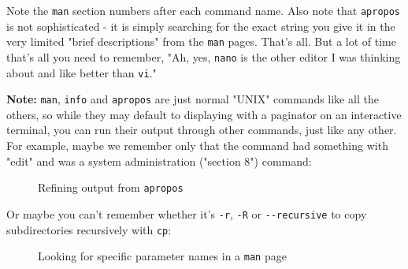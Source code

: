 \documentclass[10pt,american,]{book}
\makeatletter
\newenvironment{Shaded}{\begin{snugshade}}{\end{snugshade}}
\newcommand{\KeywordTok}[1]{\textcolor[rgb]{0.13,0.29,0.53}{\textbf{{#1}}}}
\newcommand{\StringTok}[1]{\textcolor[rgb]{0.31,0.60,0.02}{{#1}}}
\newcommand{\NormalTok}[1]{{#1}}
\numberwithin{figure}{chapter}
\DeclareRobustCommand{\drcap}[1]{\begin{figure}[H]\caption{#1}\end{figure}}
\DeclareRobustCommand{\drcmd}[1]{\index{commands!#1@\texttt{#1}}}
\renewcommand{\KeywordTok}[1]{{#1}}
\renewcommand{\StringTok}[1]{{#1}}
\renewcommand{\NormalTok}[1]{{#1}}
\makeatother
\begin{document}
Note the \texttt{man} section numbers after each command name. Also note
that \texttt{apropos} is not sophisticated - it is simply searching for
the exact string you give it in the very limited "brief descriptions"
from the \texttt{man} pages. That's all. But a lot of time that's all
you need to remember, "Ah, yes, \texttt{nano} is the other editor I was
thinking about and like better than \texttt{vi}."

\textbf{Note:} \texttt{man}, \texttt{info} and \texttt{apropos} are just
normal "UNIX" commands like all the others, so while they may default to
displaying with a paginator on an interactive terminal, you can run
their output through other commands, just like any other. For example,
maybe we remember only that the command had something with "edit" and
was a system administration ("section 8") command:

\drcap{Refining output from \texttt{apropos}}

\begin{Shaded}
\end{Shaded}

Or maybe you can't remember whether it's \texttt{-r}, \texttt{-R} or
\texttt{-\/-recursive} to copy subdirectories recursively with
\texttt{cp}\drcmd{cp}:

\drcap{Looking for specific parameter names in a \texttt{man} page}

\begin{Shaded}
\end{Shaded}
\end{document}
